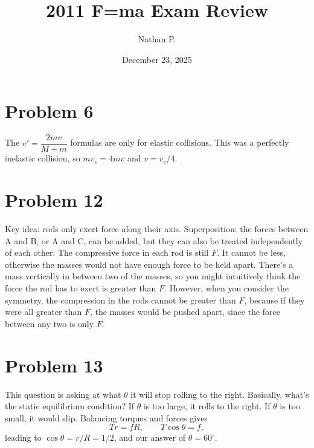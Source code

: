\documentclass[11pt]{article}
\title{2011 F=ma Exam Review}
\author{Nathan P.}
\date{December 23, 2025}
\begin{document}
\maketitle

\section*{Problem 6}
The $v'=\dfrac{2mv}{M+m}$ formulas are only for elastic collisions. This was a perfectly inelastic collision, so $mv_c=4mv$ and $v=v_c/4$.

\section*{Problem 12}
Key idea: rods only exert force along their axis.
Superposition: the forces between A and B, or A and C, can be added, but they can also be treated independently of each other.
The compressive force in each rod is still $F$. It cannot be less, otherwise the masses would not have enough force to be held apart. There's a mass vertically in between two of the masses, so you might intuitively think the force the rod has to exert is greater than $F$. However, when you consider the symmetry, the compression in the rods cannot be greater than $F$, because if they were all greater than $F$, the masses would be pushed apart, since the force between any two is only $F$.

\section*{Problem 13}
This question is asking at what $\theta$ it will stop rolling to the right. Basically, what's the static equilibrium condition? If $\theta$ is too large, it rolls to the right. If $\theta$ is too small, it would slip.
Balancing torques and forces gives
\[
Tr=fR,\qquad T\cos\theta=f,
\]
leading to $\cos\theta=r/R=1/2$, and our answer of $\theta=60^\circ$.

\begin{center}
\end{center}
\end{document}
